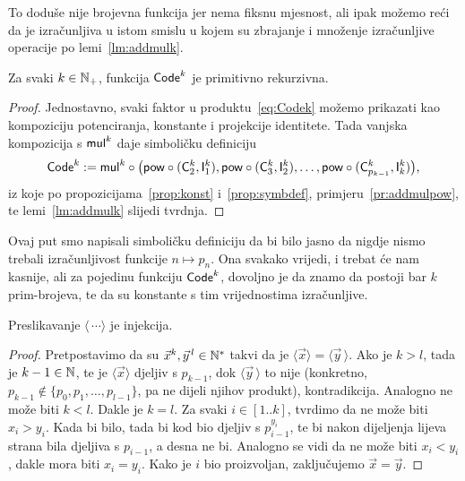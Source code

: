 To doduše nije brojevna funkcija jer nema fiksnu mjesnost, ali ipak možemo reći da je izračunljiva u istom smislu u kojem su zbrajanje i množenje izračunljive operacije po lemi~\ref{lm:addmulk}.

\begin{propozicija}\label{prop:Codekprn}
Za svaki $k\in{\mathbb N}_+$, funkcija $\mathsf{Code}^k$ je primitivno rekurzivna.
\end{propozicija}
\begin{proof}
    Jednostavno, svaki faktor u produktu~\eqref{eq:Codek} možemo prikazati kao kompoziciju potenciranja, konstante i projekcije identitete. Tada vanjska kompozicija s $\mathsf{mul}^k$ daje simboličku definiciju
    \begin{equation}\mathsf{Code}^k:=\mathsf{mul}^k\circ\bigl(\mathsf{pow}\circ(\mathsf C_2^k,\mathsf I_1^k),\mathsf{pow}\circ(\mathsf C_3^k,\mathsf I_2^k),\dotsc,\mathsf{pow}\circ(\mathsf C_{p_{k-1}}^k,\mathsf I_k^k)\bigr)\text,
    \end{equation}
    iz koje po propozicijama~\ref{prop:konst} i~\ref{prop:symbdef}, primjeru~\ref{pr:addmulpow}, te lemi~\ref{lm:addmulk} slijedi tvrdnja.
\end{proof}

Ovaj put smo napisali simboličku definiciju da bi bilo jasno da nigdje nismo trebali izračunljivost funkcije $n\mapsto p_n$. Ona svakako vrijedi, i trebat će nam kasnije, ali za pojedinu funkciju $\mathsf{Code}^k$, dovoljno je da znamo da postoji bar $k$ prim-brojeva, te da su konstante s tim vrijednostima izračunljive.

\begin{propozicija}\label{prop:codeinj}
Preslikavanje $\langle\,\cdots\rangle$ je injekcija.
\end{propozicija}
\begin{proof}
    Pretpostavimo da su $\vec x^k,\vec y^{\,l}\in{\mathbb N}^*$ takvi da je $\langle\vec x\rangle=\langle\vec y\,\rangle$. Ako je $k>l$, tada je $k-1\in{\mathbb N}$, te je $\langle\vec x\rangle$ djeljiv s $p_{k-1}$, dok $\langle\vec y\,\rangle$ to nije (konkretno, $p_{k-1}\not\in\{p_0,p_1,\dotsc,p_{l-1}\}$, pa ne dijeli njihov produkt), kontradikcija. Analogno ne može biti $k<l$. Dakle je $k=l$. Za svaki $i\in[1..k]$, tvrdimo da ne može biti $x_i>y_i$. Kada bi bilo, tada bi kod bio djeljiv s $p_{i-1}^{y_i}$, te bi nakon dijeljenja lijeva strana bila djeljiva s $p_{i-1}$, a desna ne bi. Analogno se vidi da ne može biti $x_i<y_i$, dakle mora biti $x_i=y_i$. Kako je $i$ bio proizvoljan, zaključujemo $\vec x=\vec y$.
\end{proof}

